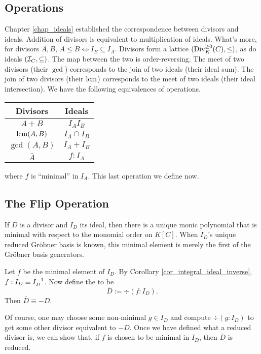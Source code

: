 \subsection{Operations}

Chapter \ref{chap_ideals} established the correspondence between divisors and ideals.
Addition of divisors is equivalent to multiplication of ideals.
What's more, for divisors $A, B$, $A \leq B \iff I_B \subseteq I_A$.
Divisors form a lattice $(\Div_K^{\geq 0}(C), \leq)$, as do ideals $(\cal I_C, \subseteq)$.
The map between the two is order-reversing.
The meet of two divisors (their $\gcd$) corresponds to the join of two ideals (their ideal sum).
The join of two divisors (their $\lcm$) corresponds to the meet of two ideals (their ideal intersection).
We have the following equivalences of operations.
\begin{center}
  \begin{tabular}{c|c}
    Divisors & Ideals \\
    \hline
    $A + B$ & $I_A I_B$ \\
    $\lcm(A,B)$ & $I_A \cap I_B$ \\
    $\gcd(A,B)$ & $I_A + I_B$ \\
    $\bar A$ & $f : I_A$
  \end{tabular}
\end{center}
where $f$ is ``minimal'' in $I_A$.
This last operation we define now.



\subsection{The Flip Operation}

If $D$ is a divisor and $I_D$ its ideal,
then there is a unique monic polynomial that is minimal with respect to the monomial order on $K[C]$.
When $I_D$'s unique reduced Gr\"obner basis is known,
this minimal element is merely the first of the Gr\"obner basis generators.

Let $f$ be the minimal element of $I_D$.
By Corollary \ref{cor_integral_ideal_inverse}, $f : I_D \equiv I_D\inv$.
Now define the  to be
  \[ \bar D := \div(f : I_D). \]
Then $\bar D \equiv -D$.

Of course, one may choose some non-minimal $g \in I_D$ and compute $\div(g : I_D)$ to get some other
divisor equivalent to $-D$.
Once we have defined what a reduced divisor is, we can show that, if $f$ is chosen to be minimal in $I_D$,
then $\bar D$ is reduced.

